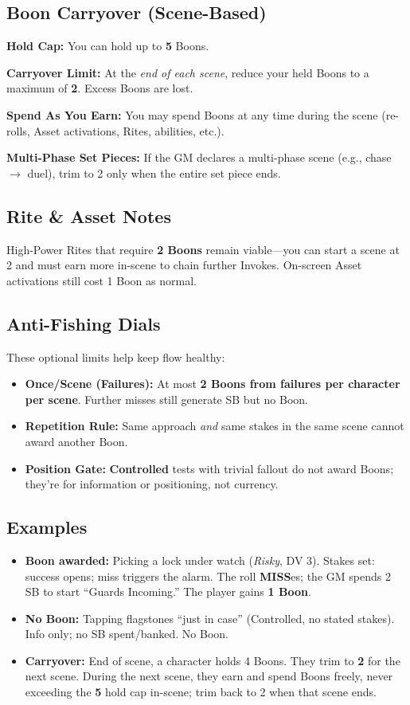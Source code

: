 \subsection{Boon Carryover (Scene-Based)}
\textbf{Hold Cap:} You can hold up to \textbf{5} Boons.

\textbf{Carryover Limit:} At the \emph{end of each scene}, reduce your held Boons to a maximum of \textbf{2}. Excess Boons are lost.

\textbf{Spend As You Earn:} You may spend Boons at any time during the scene (re-rolls, Asset activations, Rites, abilities, etc.).

\textbf{Multi-Phase Set Pieces:} If the GM declares a multi-phase scene (e.g., chase $\rightarrow$ duel), trim to 2 only when the entire set piece ends.

\subsection{Rite \& Asset Notes}
High-Power Rites that require \textbf{2 Boons} remain viable—you can start a scene at 2 and must earn more in-scene to chain further Invokes. On-screen Asset activations still cost 1 Boon as normal.

\subsection{Anti-Fishing Dials}
These optional limits help keep flow healthy:
\begin{itemize}
  \item \textbf{Once/Scene (Failures):} At most \textbf{2 Boons from failures per character per scene}. Further misses still generate SB but no Boon.
  \item \textbf{Repetition Rule:} Same approach \emph{and} same stakes in the same scene cannot award another Boon.
  \item \textbf{Position Gate:} \textbf{Controlled} tests with trivial fallout do not award Boons; they're for information or positioning, not currency.
\end{itemize}

\subsection{Examples}
\begin{itemize}
  \item \textbf{Boon awarded:} Picking a lock under watch (\emph{Risky}, DV 3). Stakes set: success opens; miss triggers the alarm. The roll \textbf{MISS}es; the GM spends 2 SB to start ``Guards Incoming.'' The player gains \textbf{1 Boon}.
  \item \textbf{No Boon:} Tapping flagstones ``just in case'' (Controlled, no stated stakes). Info only; no SB spent/banked. No Boon.
  \item \textbf{Carryover:} End of scene, a character holds 4 Boons. They trim to \textbf{2} for the next scene. During the next scene, they earn and spend Boons freely, never exceeding the \textbf{5} hold cap in-scene; trim back to 2 when that scene ends.
\end{itemize}

